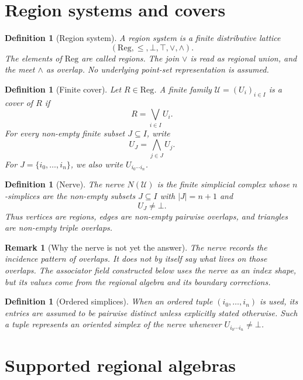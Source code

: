 \documentclass[11pt]{article}
\newtheorem{definition}[theorem]{Definition}
\newtheorem{remark}[theorem]{Remark}
\newcommand{\Reg}{\mathrm{Reg}}
\begin{document}
\section{Region systems and covers}

\begin{definition}[Region system]
A region system is a finite distributive lattice
\[
(\Reg,\leq,\bot,\top,\vee,\wedge).
\]
The elements of \(\Reg\) are called regions. The join \(\vee\) is read as regional union, and the meet \(\wedge\) as overlap. No underlying point-set representation is assumed.
\end{definition}

\begin{definition}[Finite cover]
Let \(R\in \Reg\). A finite family \(\mathcal U=(U_i)_{i\in I}\) is a cover of \(R\) if
\[
R=\bigvee_{i\in I}U_i.
\]
For every non-empty finite subset \(J\subseteq I\), write
\[
U_J=\bigwedge_{j\in J}U_j.
\]
For \(J=\{i_0,\ldots,i_n\}\), we also write \(U_{i_0\cdots i_n}\).
\end{definition}

\begin{definition}[Nerve]
The nerve \(N(\mathcal U)\) is the finite simplicial complex whose \(n\)-simplices are the non-empty subsets \(J\subseteq I\) with \(|J|=n+1\) and
\[
U_J\neq \bot.
\]
Thus vertices are regions, edges are non-empty pairwise overlaps, and triangles are non-empty triple overlaps.
\end{definition}

\begin{remark}[Why the nerve is not yet the answer]
The nerve records the incidence pattern of overlaps. It does not by itself say what lives on those overlaps. The associator field constructed below uses the nerve as an index shape, but its values come from the regional algebra and its boundary corrections.
\end{remark}

\begin{definition}[Ordered simplices]
When an ordered tuple \((i_0,\ldots,i_n)\) is used, its entries are assumed to be pairwise distinct unless explicitly stated otherwise. Such a tuple represents an oriented simplex of the nerve whenever \(U_{i_0\cdots i_n}\neq \bot\).
\end{definition}

\section{Supported regional algebras}
\end{document}
